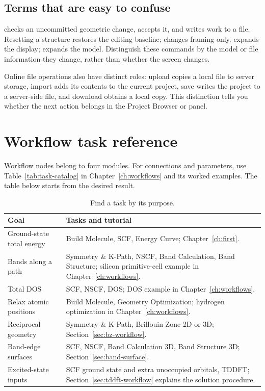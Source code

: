 \subsection{Terms that are easy to confuse}

 checks an uncommitted geometric change,  accepts it, and  writes work to a file. Resetting a structure restores the editing baseline;  changes framing only.  expands the display;  expands the model. Distinguish these commands by the model or file information they change, rather than whether the screen changes.

Online file operations also have distinct roles: upload copies a local file to server storage, import adds its contents to the current project, save writes the project to a server-side file, and download obtains a local copy. This distinction tells you whether the next action belongs in the Project Browser or  panel.

\section{Workflow task reference}

Workflow nodes belong to four modules. For connections and parameters, use Table~\ref{tab:task-catalog} in Chapter~\ref{ch:workflows} and its worked examples. The table below starts from the desired result.

\begin{table}[htbp]
\centering
\caption{Find a task by its purpose.}
\begin{tabularx}{\linewidth}{lX}
\toprule
Goal & Tasks and tutorial \\
\midrule
Ground-state total energy & Build Molecule, SCF, Energy Curve; Chapter~\ref{ch:first}. \\
Bands along a path & Symmetry \& K-Path, NSCF, Band Calculation, Band Structure; silicon primitive-cell example in Chapter~\ref{ch:workflows}. \\
Total DOS & SCF, NSCF, DOS; DOS example in Chapter~\ref{ch:workflows}. \\
Relax atomic positions & Build Molecule, Geometry Optimization; hydrogen optimization in Chapter~\ref{ch:workflows}. \\
Reciprocal geometry & Symmetry \& K-Path, Brillouin Zone 2D or 3D; Section~\ref{sec:bz-workflow}. \\
Band-edge surfaces & SCF, NSCF, Band Calculation 3D, Band Structure 3D; Section~\ref{sec:band-surface}. \\
Excited-state inputs & SCF ground state and extra unoccupied orbitals, TDDFT; Section~\ref{sec:tddft-workflow} explains the solution procedure. \\
\bottomrule
\end{tabularx}
\end{table}

